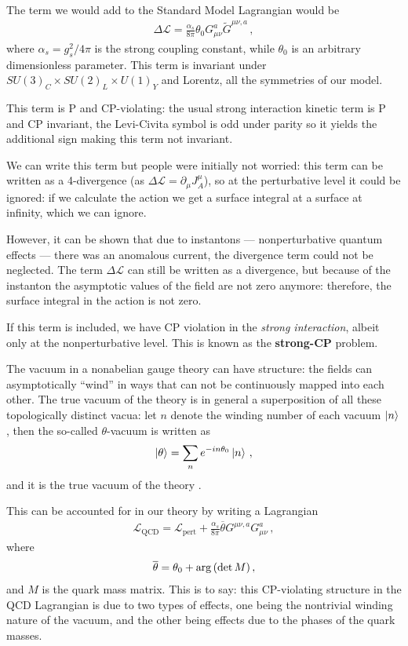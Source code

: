 \documentclass[main.tex]{subfiles}
\begin{document}
The term we would add to the Standard Model Lagrangian would be 
%
\begin{align}
\Delta \mathscr{L} = 
\frac{\alpha_{s}}{8 \pi }  \theta_0 G^{a}_{\mu \nu }
\widetilde{G}^{\mu \nu , a}
\,,
\end{align}
%
where \(\alpha_{s} = g_s^2 / 4 \pi \) is the strong coupling constant, while \(\theta_0\) is an arbitrary dimensionless parameter.
This term is invariant under \(SU(3)_C \times SU(2)_L \times U(1)_Y\) and Lorentz, all the symmetries of our model.

This term is P and CP-violating: the usual strong interaction kinetic term is P and CP invariant, the Levi-Civita symbol is odd under parity so it yields the additional sign making this term not invariant.

We can write this term but people were initially not worried: this term can be written as a 4-divergence (as \(\Delta \mathscr{L} = \partial_{\mu } J^{\mu }_A\)), so at the perturbative level it could be ignored: 
if we calculate the action we get a surface integral at a surface at infinity, which we can ignore.

However, it can be shown that due to instantons --- nonperturbative quantum effects --- there was an anomalous current, the divergence term could not be neglected. 
The term \(\Delta \mathscr{L}\) can still be written as a divergence, but because of the instanton the asymptotic values of the field are not zero anymore: therefore, the surface integral in the action is not zero. 

If this term is included, we have CP violation in the \emph{strong interaction}, albeit only at the nonperturbative level. 
This is known as the \textbf{strong-CP} problem.

The vacuum in a nonabelian gauge theory can have structure: the fields can asymptotically ``wind'' in ways that can not be continuously mapped into each other. The true vacuum of the theory is in general a superposition of all these topologically distinct vacua: let \(n\) denote the winding number of each vacuum \(\ket{n}\), then the so-called \(\theta \)-vacuum is written as 
%
\begin{align}
\ket{\theta } = \sum _{n} e^{-in \theta_0 } \ket{n}
\,,
\end{align}
%
and it is the true vacuum of the theory \cite[eq.\ 10.2]{kolbEarlyUniverse1994}.

This can be accounted for in our theory by writing a Lagrangian 
%
\begin{align}
\mathscr{L} _{\text{QCD}} = 
\mathscr{L} _{\text{pert}}
+ \frac{\alpha_{s}  }{8 \pi }
\overline{\theta} G^{\mu \nu , a} G^{a}_{\mu \nu }
\,,
\end{align}
%
where 
%
\begin{align} \label{eq:theta-parameter-strong-CP-violation}
\overline{\theta} = \theta_0  + \arg \qty(\det M)
\,,
\end{align}
%
and \(M\) is the quark mass matrix. This is to say: this CP-violating structure in the QCD Lagrangian is due to two types of effects, one being the nontrivial winding nature of the vacuum, and the other being effects due to the phases of the quark masses.
\end{document}
